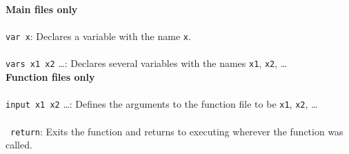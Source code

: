 \documentclass{report}
\begin{document}
\textbf{Main files only} \\ \\
\texttt{var x}: Declares a variable with the name \texttt{x}. \\ \\
\texttt{vars x1 x2} \dots: Declares several variables with the names \texttt{x1}, \texttt{x2}, \dots \\

\textbf{Function files only} \\ \\
\texttt{input x1 x2} \dots: Defines the arguments to the function file to be \texttt{x1}, \texttt{x2}, \dots \\ \\\
\texttt{return}: Exits the function and returns to executing wherever the function was called. \\
\end{document}
